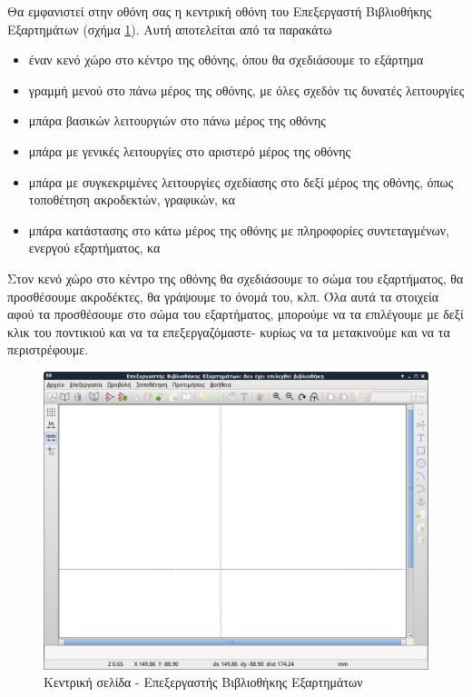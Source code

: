 \documentclass[a4paper]{article}
\begin{document}
Θα εμφανιστεί στην οθόνη σας η κεντρική οθόνη του Επεξεργαστή Βιβλιοθήκης Εξαρτημάτων (σχήμα \ref{fig:libed-main-window}). Αυτή αποτελείται από τα παρακάτω
\begin{itemize}
    \item έναν κενό χώρο στο κέντρο της οθόνης, όπου θα σχεδιάσουμε το εξάρτημα
    \item γραμμή μενού στο πάνω μέρος της οθόνης, με όλες σχεδόν τις δυνατές λειτουργίες
    \item μπάρα βασικών λειτουργιών στο πάνω μέρος της οθόνης
    \item μπάρα με γενικές λειτουργίες στο αριστερό μέρος της οθόνης
    \item μπάρα με συγκεκριμένες λειτουργίες σχεδίασης στο δεξί μέρος της οθόνης, όπως τοποθέτηση ακροδεκτών, γραφικών, κα
    \item μπάρα κατάστασης στο κάτω μέρος της οθόνης με πληροφορίες συντεταγμένων, ενεργού εξαρτήματος, κα
\end{itemize}

Στον κενό χώρο στο κέντρο της οθόνης θα σχεδιάσουμε το σώμα του εξαρτήματος, θα προσθέσουμε ακροδέκτες, θα γράψουμε το όνομά του, κλπ. Όλα αυτά τα στοιχεία αφού τα προσθέσουμε στο σώμα του εξαρτήματος, μπορούμε να τα επιλέγουμε με δεξί κλικ του ποντικιού και να τα επεξεργαζόμαστε- κυρίως να τα μετακινούμε και να τα περιστρέφουμε.

\begin{figure}
  \begin{center}
    \includegraphics[width=.9\textwidth]{img/libed-main-window.png}
    \caption{Kεντρική σελίδα - Επεξεργαστής Βιβλιοθήκης Εξαρτημάτων}
    \label{fig:libed-main-window}
  \end{center}
\end{figure}
\end{document}

